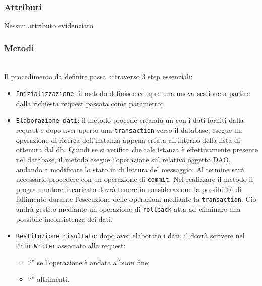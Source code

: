 \subsubsection*{Attributi}

Nessun attributo evidenziato


\subsubsection*{Metodi}
\begin{description}
	\item{}\\
	Il procedimento da definire passa attraverso 3 step essenziali:
	\begin{itemize}
		\item \texttt{Inizializzazione}: il metodo definisce ed apre una nuova sessione a partire dalla richiesta request passata come parametro;
		\item \texttt{Elaborazione dati}: il metodo procede creando un  con i dati forniti dalla request e dopo aver aperto una \texttt{transaction} verso il database, esegue un operazione di ricerca dell'instanza appena creata all'interno della lista di  ottenuta dal db. Quindi se si verifica che tale istanza è effettivamente presente nel database, il metodo esegue l'operazione  sul relativo oggetto DAO, andando a modificare lo stato in di lettura del messaggio. Al termine sarà necessario procedere con un operazione di \texttt{commit}. Nel realizzare il metodo il programmatore incaricato dovrà tenere in considerazione la possibilità di fallimento durante l'esecuzione delle operazioni mediante la \texttt{transaction}. Ciò andrà gestito mediante un operazione di \texttt{rollback} atta ad eliminare una possibile inconsistenza dei dati.
		\item \texttt{Restituzione risultato}: dopo aver elaborato i dati, il  dovrà scrivere nel \texttt{PrintWriter} associato alla request:
			\begin{itemize}
				\item ``'' se l'operazione è andata a buon fine;
				\item ``'' altrimenti.
			\end{itemize}
	\end{itemize}

\end{description}

